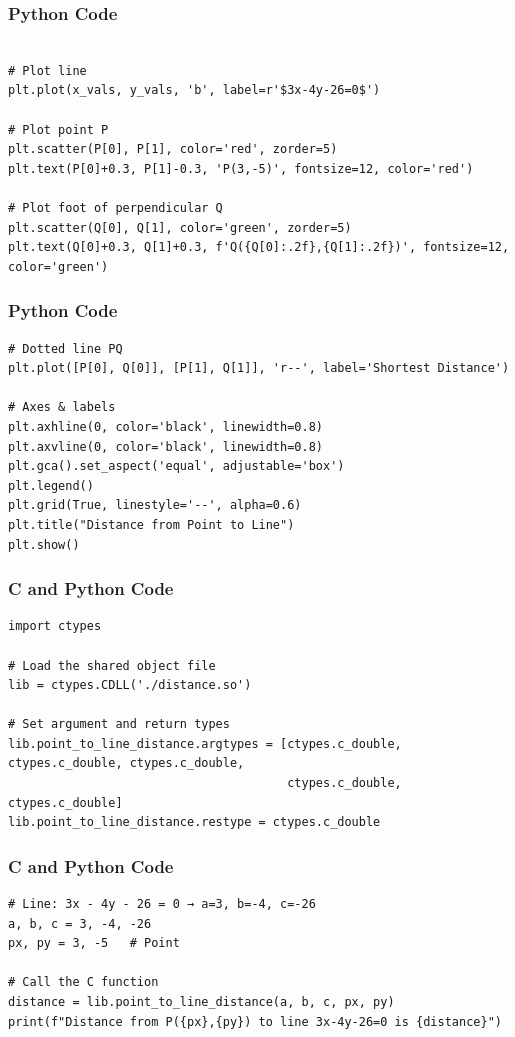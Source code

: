 \documentclass{beamer}
\begin{document}
\begin{frame}[fragile]
\frametitle{Python Code}
\begin{lstlisting}

# Plot line
plt.plot(x_vals, y_vals, 'b', label=r'$3x-4y-26=0$')

# Plot point P
plt.scatter(P[0], P[1], color='red', zorder=5)
plt.text(P[0]+0.3, P[1]-0.3, 'P(3,-5)', fontsize=12, color='red')

# Plot foot of perpendicular Q
plt.scatter(Q[0], Q[1], color='green', zorder=5)
plt.text(Q[0]+0.3, Q[1]+0.3, f'Q({Q[0]:.2f},{Q[1]:.2f})', fontsize=12, color='green')

\end{lstlisting}
\end{frame}
\begin{frame}[fragile]
\frametitle{Python Code}
\begin{lstlisting}
# Dotted line PQ
plt.plot([P[0], Q[0]], [P[1], Q[1]], 'r--', label='Shortest Distance')

# Axes & labels
plt.axhline(0, color='black', linewidth=0.8)
plt.axvline(0, color='black', linewidth=0.8)
plt.gca().set_aspect('equal', adjustable='box')
plt.legend()
plt.grid(True, linestyle='--', alpha=0.6)
plt.title("Distance from Point to Line")
plt.show()
\end{lstlisting}
\end{frame}
\begin{frame}[fragile]
\frametitle{C and Python Code}
\begin{lstlisting}
import ctypes

# Load the shared object file
lib = ctypes.CDLL('./distance.so')

# Set argument and return types
lib.point_to_line_distance.argtypes = [ctypes.c_double, ctypes.c_double, ctypes.c_double,
                                       ctypes.c_double, ctypes.c_double]
lib.point_to_line_distance.restype = ctypes.c_double
\end{lstlisting}
\end{frame}
\begin{frame}[fragile]
\frametitle{C and Python Code}
\begin{lstlisting}
# Line: 3x - 4y - 26 = 0 → a=3, b=-4, c=-26
a, b, c = 3, -4, -26
px, py = 3, -5   # Point

# Call the C function
distance = lib.point_to_line_distance(a, b, c, px, py)
print(f"Distance from P({px},{py}) to line 3x-4y-26=0 is {distance}")
\end{lstlisting}
\end{frame}
\end{document}
